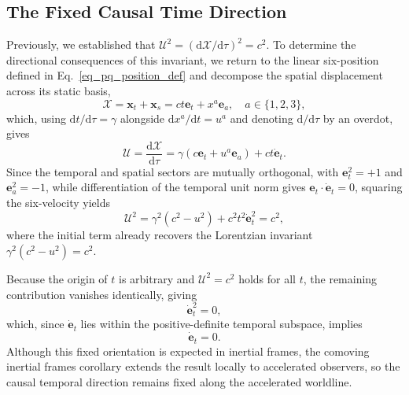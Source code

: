 \subsection{The Fixed Causal Time Direction}
Previously, we established that $\boldsymbol{\mathcal{U}}^{2}=\left(\mathrm{d}\boldsymbol{\mathcal{X}}/\mathrm{d}\tau\right)^{2}=c^{2}$. To determine the directional consequences of this invariant, we return to the linear six-position defined in Eq.~\eqref{eq_pq_position_def} and decompose the spatial displacement across its static basis,
\begin{equation}
    \boldsymbol{\mathcal{X}}=\mathbf{x}_{t}+\mathbf{x}_{s}=ct\mathbf{e}_{t}+x^{a}\mathbf{e}_{a},\quad a\in\{1,2,3\},
\end{equation}
which, using $\mathrm{d}t/\mathrm{d}\tau=\gamma$ alongside $\mathrm{d}x^{a}/\mathrm{d}t=u^{a}$ and denoting $\mathrm{d}/\mathrm{d}\tau$ by an overdot, gives
\begin{equation}\label{eq_six_velocity}
    \boldsymbol{\mathcal{U}}=\frac{\mathrm{d}\boldsymbol{\mathcal{X}}}{\mathrm{d}\tau}=\gamma(c\mathbf{e}_{t}+u^{a}\mathbf{e}_{a})+ct\dot{\mathbf{e}}_{t}.
\end{equation}
Since the temporal and spatial sectors are mutually orthogonal, with $\mathbf{e}_{t}^{2}=+1$ and $\mathbf{e}_{a}^{2}=-1$, while differentiation of the temporal unit norm gives $\mathbf{e}_{t}\cdot\dot{\mathbf{e}}_{t}=0$, squaring the six-velocity yields
\begin{equation}
    \boldsymbol{\mathcal{U}}^{2}=\gamma^{2}(c^{2}-u^{2})+c^{2}t^{2}\dot{\mathbf{e}}_{t}^{2}=c^{2},
\end{equation}
where the initial term already recovers the Lorentzian invariant $\gamma^{2}(c^{2}-u^{2})=c^{2}$.

Because the origin of $t$ is arbitrary and $\boldsymbol{\mathcal{U}}^{2}=c^{2}$ holds for all $t$, the remaining contribution vanishes identically, giving
\begin{equation}
    \dot{\mathbf{e}}_{t}^{2}=0,
\end{equation}
which, since $\dot{\mathbf{e}}_{t}$ lies within the positive-definite temporal subspace, implies
\begin{equation}\label{eq_compatibility_condition}
    \dot{\mathbf{e}}_{t}=0.
\end{equation}
Although this fixed orientation is expected in inertial frames, the comoving inertial frames corollary extends the result locally to accelerated observers, so the causal temporal direction remains fixed along the accelerated worldline.

